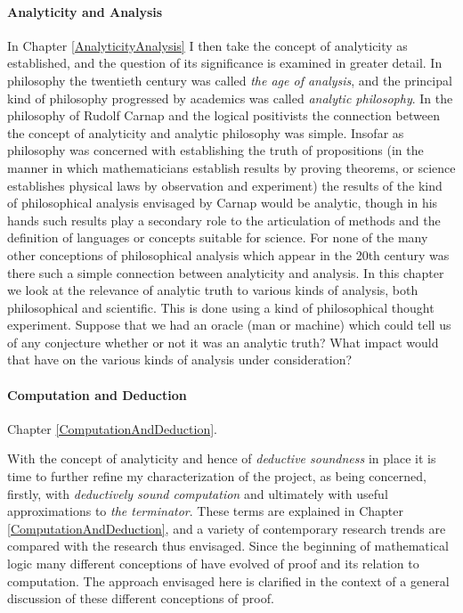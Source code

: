 \paragraph{Analyticity and Analysis}

In Chapter \ref{AnalyticityAnalysis} I then take the concept of
analyticity as established, and the question of its significance is
examined in greater detail. 
In philosophy the twentieth century was called \emph{the age of
  analysis}, and the principal kind of philosophy progressed by
academics was called \emph{analytic philosophy}. 
In the philosophy of Rudolf Carnap and the logical positivists the
connection between the concept of analyticity and analytic philosophy
was simple. 
Insofar as philosophy was concerned with establishing the truth of
propositions (in the manner in which mathematicians establish results
by proving theorems, or science establishes physical laws by
observation and experiment) the results of the kind of philosophical
analysis envisaged by Carnap would be analytic, though in his hands
such results play a secondary role to the articulation of methods and
the definition of languages or concepts suitable for science. 
For none of the many other conceptions of philosophical analysis which
appear in the 20th century was there such a simple connection
between analyticity and analysis. 
In this chapter we look at the relevance of analytic truth to various
kinds of analysis, both philosophical and scientific. 
This is done using a kind of philosophical thought experiment.
Suppose that we had an oracle (man or machine) which could tell us of
any conjecture whether or not it was an analytic truth? 
What impact would that have on the various kinds of analysis under
consideration?

\paragraph{Computation and Deduction}

Chapter \ref{ComputationAndDeduction}.

With the concept of analyticity and hence of \emph{deductive
  soundness} in place it is time to further refine my characterization
of the project, as being concerned, firstly, with \emph{deductively
  sound computation} and ultimately with useful approximations to
\emph{the terminator}. 
These terms are explained in Chapter
\ref{ComputationAndDeduction}, and a variety of
contemporary research trends are compared with the research thus envisaged.
Since the beginning of mathematical logic many different conceptions of
have evolved of proof and its relation to computation.
The approach envisaged here is clarified in the context of a general
discussion of these different conceptions of proof.

